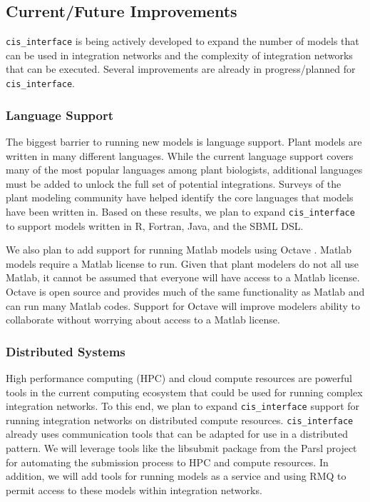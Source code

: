 \documentclass[journal]{IEEEtran}
\newcommand{\cis}{{\tt cis\_interface}{}}
\begin{document}
\subsection{Current/Future Improvements}\label{SS:future}
%
{\cis} is being actively developed to expand the number of models 
that can be used in integration networks and the complexity of integration 
networks that can be executed. Several improvements are already in progress/planned for {\cis}.

\subsubsection{Language Support}\label{SS:langsupport}
%
The biggest barrier to running new models is language support. Plant models 
are written in many different languages. While the current language support 
covers many of the most popular languages among plant biologists, 
additional languages must be added to unlock the full set of potential integrations. 
Surveys of the plant modeling community have helped identify the core languages 
that models have been written in. Based on these results, we plan to expand 
{\cis} to support models written in R, Fortran, Java, and the SBML \citep{Hucka2003} DSL.

We also plan to add support for running Matlab models using Octave \citep{Eaton2002}. Matlab 
models require a Matlab license to run. Given that plant modelers do not all 
use Matlab, it cannot be assumed that everyone will have access to a Matlab 
license. Octave is open source and provides much of the same functionality 
as Matlab and can run many Matlab codes. Support for Octave will improve 
modelers ability to collaborate without worrying about access to a Matlab 
license. 

\subsubsection{Distributed Systems}\label{SS:distributed}
%
High performance computing (HPC) and cloud compute resources are powerful 
tools in the current computing ecosystem that could be used for running 
complex integration networks. To this end, we plan to expand {\cis} 
support for running integration networks on distributed compute resources. 
{\cis} already uses communication tools that can be adapted for use 
in a distributed pattern. We will leverage tools like the libsubmit package from the 
Parsl project \citep{babuji18} for 
automating the submission process to HPC and compute resources. In addition, 
we will add tools for running models as a service and using RMQ to 
permit access to these models within integration networks.
\end{document}

